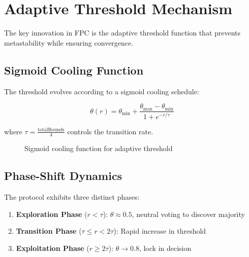 \section{Adaptive Threshold Mechanism}

\label{sec:adaptive}

The key innovation in FPC is the adaptive threshold function that prevents metastability while ensuring convergence.

\subsection{Sigmoid Cooling Function}

The threshold evolves according to a sigmoid cooling schedule:

\begin{equation}
\theta(r) = \theta_{\min} + \frac{\theta_{\max} - \theta_{\min}}{1 + e^{-r/\tau}}
\label{eq:sigmoid}
\end{equation}

where $\tau = \frac{\text{totalRounds}}{4}$ controls the transition rate.

\begin{figure}[h]
\centering
{}
\caption{Sigmoid cooling function for adaptive threshold}
\label{fig:sigmoid}
\end{figure}

\subsection{Phase-Shift Dynamics}

The protocol exhibits three distinct phases:

\begin{enumerate}
\item \textbf{Exploration Phase} ($r < \tau$): $\theta \approx 0.5$, neutral voting to discover majority
\item \textbf{Transition Phase} ($\tau \leq r < 2\tau$): Rapid increase in threshold
\item \textbf{Exploitation Phase} ($r \geq 2\tau$): $\theta \to 0.8$, lock in decision
\end{enumerate}

